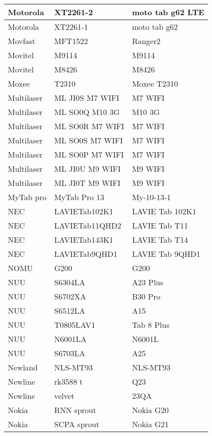 \begin{tabularx}{\linewidth}{|l|X|X|}
        Motorola & XT2261-2 & moto tab g62 LTE \\ \hline
        Motorola & XT2261-1 & moto tab g62 \\ \hline
        Movfast & MFT1522 & Ranger2 \\ \hline
        Movitel & M9114 & M9114 \\ \hline
        Movitel & M8426 & M8426 \\ \hline
        Moxee & T2310 & Moxee T2310 \\ \hline
        Multilaser & ML JI0S M7 WIFI & M7 WIFI \\ \hline
        Multilaser & ML SO0Q M10 3G & M10 3G \\ \hline
        Multilaser & ML SO0R M7 WIFI & M7 WIFI \\ \hline
        Multilaser & ML SO0S M7 WIFI & M7 WIFI \\ \hline
        Multilaser & ML SO0P M7 WIFI & M7 WIFI \\ \hline
        Multilaser & ML JI0U M9 WIFI & M9 WIFI \\ \hline
        Multilaser & ML JI0T M9 WIFI & M9 WIFI \\ \hline
        MyTab pro & MyTab Pro 13 & My-10-13-1 \\ \hline
        NEC & LAVIETab102K1 & LAVIE Tab 102K1 \\ \hline
        NEC & LAVIETab11QHD2 & LAVIE Tab T11 \\ \hline
        NEC & LAVIETab143K1 & LAVIE Tab T14 \\ \hline
        NEC & LAVIETab9QHD1 & LAVIE Tab 9QHD1 \\ \hline
        NOMU & G200 & G200 \\ \hline
        NUU & S6304LA & A23 Plus \\ \hline
        NUU & S6702XA & B30 Pro \\ \hline
        NUU & S6512LA & A15 \\ \hline
        NUU & T0805LAV1 & Tab 8 Plus \\ \hline
        NUU & N6001LA & N6001L \\ \hline
        NUU & S6703LA & A25 \\ \hline
        Newland & NLS-MT93 & NLS-MT93 \\ \hline
        Newline & rk3588 t & Q23 \\ \hline
        Newline & velvet & 23QA \\ \hline
        Nokia & RNN sprout & Nokia G20 \\ \hline
        Nokia & SCPA sprout & Nokia G21 \\ \hline

\end{tabularx}
